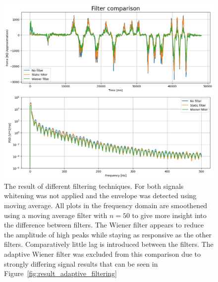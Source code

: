 \begin{figure}[h!t]
	\begin{center}
		\includegraphics[width=1.0\columnwidth]{images/measurement_filtering.png}
	\end{center}
	\caption{The result of different filtering techniques. For both signals whitening was not applied and the envelope was detected using moving average. All plots in the frequency domain are smoothened using a moving average filter with $n=50$ to give more insight into the difference between filters. The Wiener filter appears to reduce the amplitude of high peaks while staying as responsive as the other filters. Comparatively little lag is introduced between the filters. The adaptive Wiener filter was excluded from this comparison due to strongly differing signal results that can be seen in Figure~\ref{fig:result_adaptive_filtering}}
	\label{fig:result_filtering}
\end{figure}

